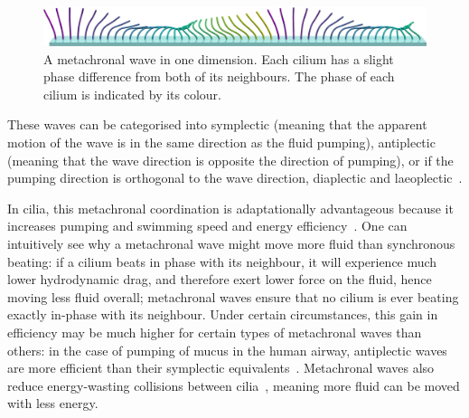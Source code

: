 \begin{figure}[ht!]
    \centering
    \includegraphics[width=\textwidth]{images_other/enhanced_metachronal1d.png}
    \caption{A metachronal wave in one dimension. Each cilium has a slight phase difference from both of its neighbours. The phase of each cilium is indicated by its colour.}
    \label{fig:metachronal_wave_pov}
\end{figure}

These waves can be categorised into symplectic (meaning that the apparent motion of the wave is in the same direction as the fluid pumping), antiplectic (meaning that the wave direction is opposite the direction of pumping), or if the pumping direction is orthogonal to the wave direction, diaplectic and laeoplectic~.

In cilia, this metachronal coordination is adaptationally advantageous because it increases pumping and swimming speed and energy efficiency~. One can intuitively see why a metachronal wave might move more fluid than synchronous beating: if a cilium beats in phase with its neighbour, it will experience much lower hydrodynamic drag, and therefore exert lower force on the fluid, hence moving less fluid overall; metachronal waves ensure that no cilium is ever beating exactly in-phase with its neighbour. Under certain circumstances, this gain in efficiency may be much higher for certain types of metachronal waves than others: in the case of pumping of mucus in the human airway, antiplectic waves are more efficient than their symplectic equivalents~. Metachronal waves also reduce energy-wasting collisions between cilia~, meaning more fluid can be moved with less energy.

